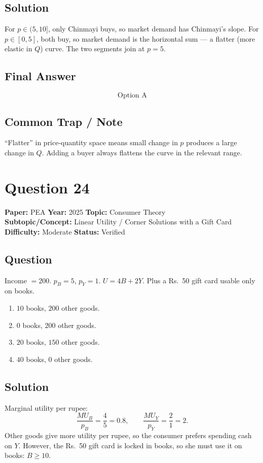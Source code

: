 \documentclass[11pt]{article}
\begin{document}
\subsection*{Solution}
For $p \in (5,10]$, only Chinmayi buys, so market demand has Chinmayi's slope. For $p \in [0,5]$, both buy, so market demand is the horizontal sum --- a flatter (more elastic in $Q$) curve. The two segments join at $p = 5$.

\subsection*{Final Answer}
\[
\boxed{\text{Option A}}
\]

\subsection*{Common Trap / Note}
``Flatter'' in price-quantity space means small change in $p$ produces a large change in $Q$. Adding a buyer always flattens the curve in the relevant range.

\section*{Question 24}
\textbf{Paper:} PEA \quad \textbf{Year:} 2025 \quad \textbf{Topic:} Consumer Theory \\
\textbf{Subtopic/Concept:} Linear Utility / Corner Solutions with a Gift Card \\
\textbf{Difficulty:} Moderate \quad \textbf{Status:} Verified

\subsection*{Question}
Income $= 200$. $p_B = 5$, $p_Y = 1$. $U = 4B + 2Y$. Plus a Rs.\ 50 gift card usable only on books.
\begin{enumerate}[label=(\Alph*)]
\item $10$ books, $200$ other goods.
\item $0$ books, $200$ other goods.
\item $20$ books, $150$ other goods.
\item $40$ books, $0$ other goods.
\end{enumerate}

\subsection*{Solution}
Marginal utility per rupee:
\[
\frac{MU_B}{p_B} = \frac{4}{5} = 0.8, \qquad \frac{MU_Y}{p_Y} = \frac{2}{1} = 2.
\]
Other goods give more utility per rupee, so the consumer prefers spending cash on $Y$. However, the Rs.\ 50 gift card is locked in books, so she must use it on books: $B \ge 10$.
\end{document}
